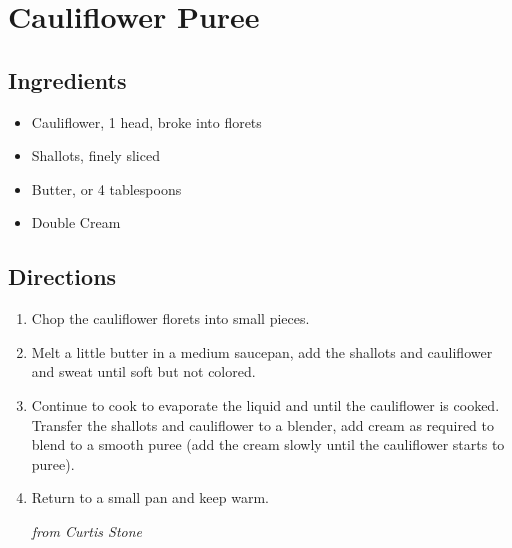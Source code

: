 \section{Cauliflower Puree}

\subsection{ Ingredients }

\begin{itemize}
  \item <2 lbs> Cauliflower, 1 head, broke into florets
  \item <2> Shallots, finely sliced
  \item <2 oz> Butter, or 4 tablespoons 
  \item <4 tbs> Double Cream
\end{itemize}

\subsection{ Directions }

\begin{enumerate}
  \item Chop the cauliflower florets into small pieces. 
  \item Melt a little butter in a medium saucepan, add the shallots and cauliflower and sweat until soft but not colored. 
  \item Continue to cook to evaporate the liquid and until the cauliflower is cooked. Transfer the shallots and cauliflower to a blender, add cream as required to blend to a smooth puree (add the cream slowly until the cauliflower starts to puree). 
  \item Return to a small pan and keep warm. 

\textit{from Curtis Stone}
\end{enumerate}
